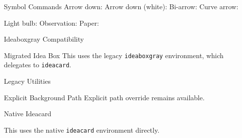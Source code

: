 \documentclass[aspectratio=169]{beamer}
\begin{document}
\begin{frame}{Symbol Commands}
  Arrow down: \downarrowblack \quad
  Arrow down (white): \downarrowwhite \quad
  Bi-arrow: \twoheadsearrow \quad
  Curve arrow: \droparrow

  \bigskip

  Light bulb: \lightbulb \quad
  Observation: \observation \quad
  Paper: \paper
\end{frame}

\begin{frame}{Ideaboxgray Compatibility}
  \begin{ideaboxgray}[breakable]{Migrated Idea Box}
    This uses the legacy \texttt{ideaboxgray} environment,
    which delegates to \texttt{ideacard}.
  \end{ideaboxgray}
\end{frame}

\begin{frame}{Legacy Utilities}
  \setTitleBackground
\end{frame}

\begin{frame}{Explicit Background Path}
  Explicit path override remains available.
\end{frame}

\begin{frame}{Native Ideacard}
  \begin{ideacard}[title={Native Card}]
    This uses the native \texttt{ideacard} environment directly.
  \end{ideacard}
\end{frame}
\end{document}
